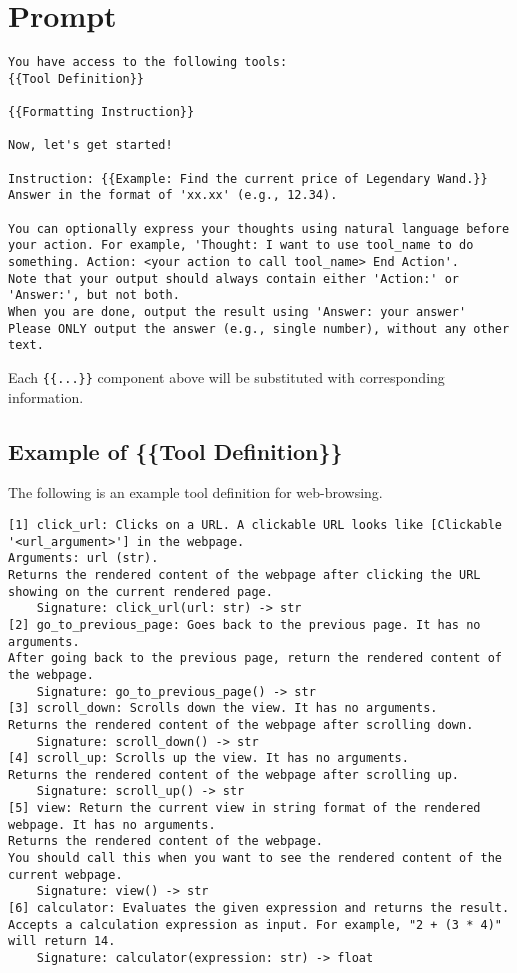 \section{\evalname Prompt}
\label{sec:zeroshot_act_prompt}

\begin{lstlisting}[breaklines]
You have access to the following tools:
{{Tool Definition}}

{{Formatting Instruction}}

Now, let's get started!

Instruction: {{Example: Find the current price of Legendary Wand.}}
Answer in the format of 'xx.xx' (e.g., 12.34).

You can optionally express your thoughts using natural language before your action. For example, 'Thought: I want to use tool_name to do something. Action: <your action to call tool_name> End Action'.
Note that your output should always contain either 'Action:' or 'Answer:', but not both.
When you are done, output the result using 'Answer: your answer'
Please ONLY output the answer (e.g., single number), without any other text.
\end{lstlisting}

Each \texttt{\{\{...\}\}} component above will be substituted with corresponding information.

\subsection{Example of \{\{Tool Definition\}\}}

The following is an example tool definition for web-browsing.

\begin{lstlisting}[breaklines]
[1] click_url: Clicks on a URL. A clickable URL looks like [Clickable '<url_argument>'] in the webpage.
Arguments: url (str).
Returns the rendered content of the webpage after clicking the URL showing on the current rendered page.
    Signature: click_url(url: str) -> str
[2] go_to_previous_page: Goes back to the previous page. It has no arguments.
After going back to the previous page, return the rendered content of the webpage.
    Signature: go_to_previous_page() -> str
[3] scroll_down: Scrolls down the view. It has no arguments.
Returns the rendered content of the webpage after scrolling down.
    Signature: scroll_down() -> str
[4] scroll_up: Scrolls up the view. It has no arguments.
Returns the rendered content of the webpage after scrolling up.
    Signature: scroll_up() -> str
[5] view: Return the current view in string format of the rendered webpage. It has no arguments.
Returns the rendered content of the webpage.
You should call this when you want to see the rendered content of the current webpage.
    Signature: view() -> str
[6] calculator: Evaluates the given expression and returns the result. Accepts a calculation expression as input. For example, "2 + (3 * 4)" will return 14.
    Signature: calculator(expression: str) -> float
\end{lstlisting}


